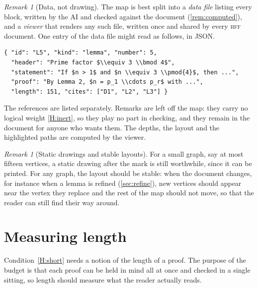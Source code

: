 \documentclass[11pt]{article}
\theoremstyle{plain}
\theoremstyle{definition}
\theoremstyle{remark}
\newtheorem{remark}[theorem]{Remark}
\theoremstyle{definition}
\theoremstyle{plain}
\theoremstyle{remark}
\newcommand{\HFF}{\textsc{hff}}
\begin{document}
\begin{remark}[Data, not drawing]\label{rem:mapdata}
The map is best split into a \emph{data file} listing every block, written by the AI and checked against the document (\cref{rem:computed}), and a \emph{viewer} that renders any such file, written once and shared by every \HFF{} document. One entry of the data file might read as follows, in JSON.
\begin{center}
\begin{minipage}{0.86\textwidth}
\small
\begin{verbatim}
{ "id": "L5", "kind": "lemma", "number": 5,
  "header": "Prime factor $\\equiv 3 \\bmod 4$",
  "statement": "If $n > 1$ and $n \\equiv 3 \\pmod{4}$, then ...",
  "proof": "By Lemma 2, $n = p_1 \\cdots p_r$ with ...",
  "length": 151, "cites": ["D1", "L2", "L3"] }
\end{verbatim}
\end{minipage}
\end{center}
The references are listed separately. Remarks are left off the map: they carry no logical weight \ref{H:inert}, so they play no part in checking, and they remain in the document for anyone who wants them. The depths, the layout and the highlighted paths are computed by the viewer.
\end{remark}

\begin{remark}[Static drawings and stable layouts]
For a small graph, say at most fifteen vertices, a static drawing after the mark is still worthwhile, since it can be printed. For any graph, the layout should be stable: when the document changes, for instance when a lemma is refined (\cref{sec:refine}), new vertices should appear near the vertex they replace and the rest of the map should not move, so that the reader can still find their way around.
\end{remark}

\section{Measuring length}\label{sec:formulas}

Condition~\ref{H:short} needs a notion of the length of a proof. The purpose of the budget is that each proof can be held in mind all at once and checked in a single sitting, so length should measure what the reader actually reads.
\end{document}

